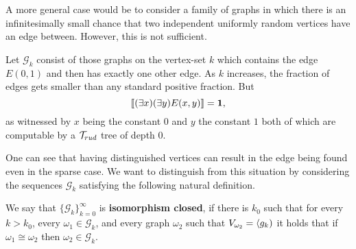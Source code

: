 A more general case would be to consider a family of graphs in which there is an infinitesimally small chance that two independent uniformly random vertices have an edge between. However, this is not sufficient.

\begin{exam}
Let $\mathcal{G}_k$ consist of those graphs on the vertex-set $k$ which contains the edge $E(0,1)$ and then has exactly one other edge. As $k$ increases, the fraction of edges gets smaller than any standard positive fraction. But
\[[\![(\exists x)(\exists y)E(x,y)]\!]=\textbf{1},\]
as witnessed by $x$ being the constant $0$ and $y$ the constant $1$ both of which are computable by a $\mathcal{T}_{rud}$ tree of depth $0$.
\end{exam}

One can see that having distinguished vertices can result in the edge being found even in the sparse case. We want to distinguish from this situation by considering the sequences $\mathcal{G}_k$ satisfying the following natural definition.

\begin{defi}
We say that $\{\mathcal{G}_k\}_{k=0}^\infty$ is \textbf{isomorphism closed}, if there is $k_0$ such that for every $k>k_0$, every $\omega_1\in\mathcal{G}_k$, and every graph $\omega_2$ such that $V_{\omega_2}=\langle g_k)$ it holds that if $\omega_1\cong \omega_2$ then $\omega_2\in\mathcal{G}_k$.
\end{defi}


